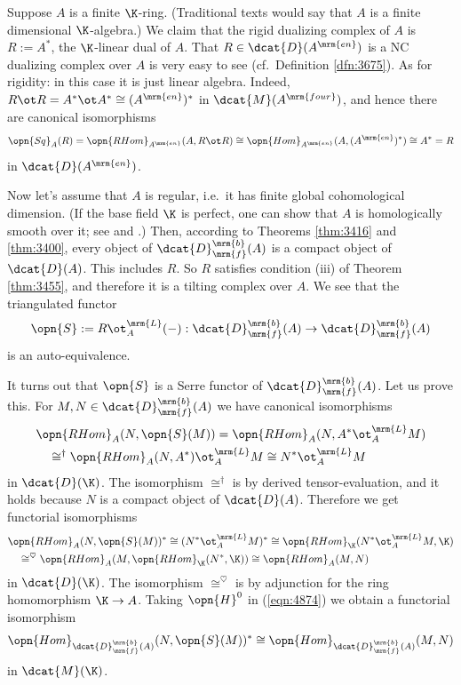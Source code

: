 \begin{exa} \label{exa:4870}
Suppose $A$ is a finite $\K$-ring. (Traditional texts would say that 
$A$ is a finite dimensional $\K$-algebra.)  
We claim that the rigid dualizing complex of $A$ is $R := A^{*}$, the 
$\K$-linear dual of $A$. That $R \in \dcat{D}(A^{\mrm{en}})$ is a NC dualizing 
complex over $A$ is very easy to see (cf.\ Definition \ref{dfn:3675}). 
As for rigidity: in this case it is just linear algebra. Indeed, 
$R \ot R = A^* \ot A^* \cong (A^{\mrm{en}})^*$ 
in $\dcat{M}(A^{\mrm{four}})$, and hence there are canonical isomorphisms
\[ \opn{Sq}_A(R) = \opn{RHom}_{A^{\mrm{en}}}(A, R \ot R) \cong 
\opn{Hom}_{A^{\mrm{en}}}(A, (A^{\mrm{en}})^*) \cong A^* = R \]
in $\dcat{D}(A^{\mrm{en}})$.

Now let's assume that $A$ is regular, i.e.\ it has finite global 
cohomological dimension. (If the base field $\K$ is perfect, one can show 
that $A$ is homologically smooth over it; see \cite{Hap2} and \cite{BGMS}.)
Then, according to Theorems \ref{thm:3416} and \ref{thm:3400}, 
every object of $\dcat{D}^{\mrm{b}}_{\mrm{f}}(A)$ is a compact object of 
$\dcat{D}(A)$. This includes $R$. So $R$ satisfies condition (iii) of 
Theorem \ref{thm:3455}, and therefore it is a tilting complex over $A$. 
We see that the triangulated functor 
\[ \opn{S} := R \ot^{\mrm{L}}_{A} (-) : \dcat{D}^{\mrm{b}}_{\mrm{f}}(A)
\to \dcat{D}^{\mrm{b}}_{\mrm{f}}(A) \]
is an auto-equivalence. 

It turns out that $\opn{S}$ is a Serre functor of 
$\dcat{D}^{\mrm{b}}_{\mrm{f}}(A)$. Let us prove this. 
For $M, N \in \dcat{D}^{\mrm{b}}_{\mrm{f}}(A)$
we have canonical isomorphisms
\[ \begin{aligned}
& \opn{RHom}_{A}(N, \opn{S}(M)) = \opn{RHom}_{A}(N, A^* \ot^{\mrm{L}}_{A} M)
\\ & \quad 
\cong^{\dag}  \opn{RHom}_{A}(N, A^*) \ot^{\mrm{L}}_{A} M \cong 
N^* \ot^{\mrm{L}}_{A} M 
\end{aligned} \]
in $\dcat{D}(\K)$. 
The isomorphism $\cong^{\dag}$ is by derived tensor-evaluation, and it holds 
because $N$ is a compact object of $\dcat{D}(A)$. 
Therefore we get functorial isomorphisms 
\begin{equation} \label{eqn:4874}
\begin{aligned}
& \opn{RHom}_{A}(N, \opn{S}(M))^* \cong (N^* \ot^{\mrm{L}}_{A} M)^* 
\cong \opn{RHom}_{\K}( N^* \ot^{\mrm{L}}_{A} M, \K) 
\\ & \quad 
\cong^{\heartsuit} \opn{RHom}_{A}(M, \opn{RHom}_{\K}(N^*, \K)) 
\cong \opn{RHom}_{A}(M, N) 
\end{aligned}
\end{equation}
in $\dcat{D}(\K)$. 
The isomorphism $\cong^{\heartsuit}$ is by adjunction for the ring homomorphism 
$\K \to A$. Taking $\opn{H}^0$ in (\ref{eqn:4874}) we obtain a functorial 
isomorphism 
\[ \opn{Hom}_{\dcat{D}^{\mrm{b}}_{\mrm{f}}(A)}(N, \opn{S}(M))^*
 \cong \opn{Hom}_{\dcat{D}^{\mrm{b}}_{\mrm{f}}(A)}(M, N)  \]
in $\dcat{M}(\K)$. 


\end{exa}
